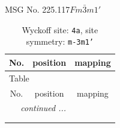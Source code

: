 \documentclass[fleqn,8pt]{jsarticle}
\begin{document}
\setcounter{MaxMatrixCols}{32}

\renewcommand{\tablename}{Table~}
\renewcommand{\figurename}{Figure~}
\begin{center}
\LARGE
MSG No. 225.117\quad$Fm\bar{3}m1'$
\end{center}
\renewcommand{\arraystretch}{1.2}
\begin{longtable}{ccc}
\caption{Wyckoff site: {\tt 4a}, site symmetry: {\tt m-3m1'}}
 \\
 \hline \hline
No. & position & mapping \\ \hline \endfirsthead

\multicolumn{2}{l}{\tablename\ \thetable{}} \\
 \hline \hline
No. & position & mapping \\ \hline \endhead

 \hline \hline
\multicolumn{2}{r}{\footnotesize\it continued ...} \\ \endfoot

 \hline \hline
\multicolumn{2}{r}{} \\ \endlastfoot


\end{longtable}
\end{document}
